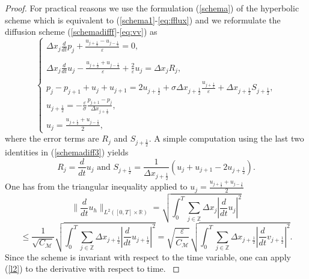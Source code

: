 \documentclass[a4paper,french,english,10pt]{article}
\newcommand\eps{\varepsilon}
\begin{document}
\begin{proof}
For practical reasons we use the formulation 
(\ref{schema}) of the hyperbolic scheme  which is equivalent to 
(\ref{schema1}-\ref{eq:fflux})
and we reformulate the diffusion scheme (\ref{schemadifff}-\ref{eq:vv})
as 
 \begin{equation}\label{schemadiff3}
\left\{
\begin{array}{lll}
\displaystyle 
\Delta x_j\frac{d}{dt} p_j
+\frac{u_{j+\frac12 }-u_{j-\frac12 }}{\eps }=0,\\
\\
\displaystyle 
\Delta x_j\frac{d}{dt} u_j
-\frac{u_{j+\frac12 }+u_{j-\frac12 }}{\eps}+\frac{2}{\eps }u_j=\Delta x_j R_j,\\
\\
\displaystyle 
p_j-p_{j+1}+u_j+u_{j+1} =2u_{j+\frac12 } +\sigma \Delta x_{j+\frac12 }
\frac{u_{j+\frac12 } }{\eps}+\Delta x_{j+\frac12}S_{j+\frac12 } , \\
\displaystyle 
u_{j+\frac12}= -\frac\eps\sigma \frac{p_{j+1}-p_j}{\Delta x_{j+\frac12}}, \\
\displaystyle 
u_j=\frac{u_{j+\frac12}+u_{j-\frac12}}{2},
\end{array}
\right.
\end{equation}
where the error terms are $R_j$ and $S_{j+\frac12 }$.
A simple computation using the  last two identities in (\ref{schemadiff3})
yields
\begin{equation*}
R_j= \frac{d}{dt} u_j
\mbox{ and }
S_{j+\frac12 }= \frac1{\Delta x_{j+\frac12} }\left(
u_j+u_{j+1} -2u_{j+\frac12 }\right).
\end{equation*}
{One has  from the triangular inequality applied to $u_j=\frac{u_{j+\frac12}+u_{j-\frac12}}{2}$
$$
\bigg\|\frac{d}{dt} u_h\bigg\|_{L^2([0,T]\times \mathbb{R})} = \sqrt{\int_0^T \sum_{j\in\mathbb{Z}} \Delta x_j \left| \frac d{dt}u_j\right|^2 }
$$
$$
\leq
\frac1{\sqrt{C_\mathcal M}}
\sqrt{\int_0^T \sum_{j\in\mathbb{Z}} \Delta x_{j+\frac12} \left| \frac d{dt}u_{j+\frac12}\right|^2 }
=
\sqrt{ \frac\eps{{C_\mathcal M}} }
\sqrt{\int_0^T \sum_{j\in\mathbb{Z}} \Delta x_{j+\frac12} \left| \frac d{dt}v_{j+\frac12}\right|^2 }.
$$
Since the scheme is invariant with respect
to the time variable,  one can apply (\ref{l2}) to the derivative with respect to time.
}
\end{proof}
\end{document}
